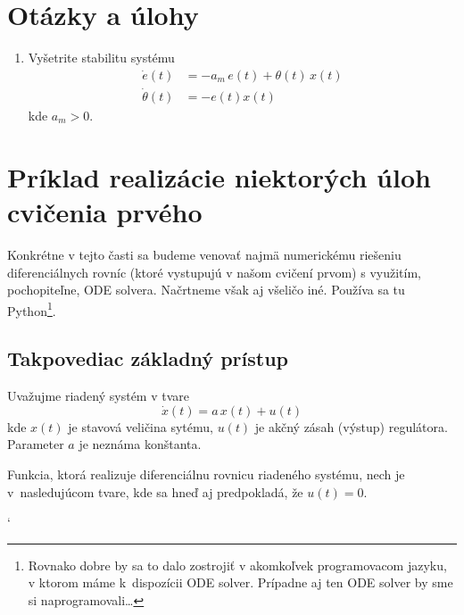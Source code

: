 \documentclass[a4paper, 10pt, ]{article}
\begin{document}
\section{Otázky a úlohy}

\begin{enumerate}[leftmargin=0pt, labelsep=3mm, itemsep=0pt]

	\item Vyšetrite stabilitu systému
	\begin{align*}
		\dot{e}(t) &= -a_m\,e(t) + \theta(t) \, x(t)  \\
		\dot{\theta}(t) &= -e(t) x(t)
	\end{align*}
	kde $a_m > 0$.

\end{enumerate}







\section{Príklad realizácie niektorých úloh cvičenia prvého}

Konkrétne v tejto časti sa budeme venovať najmä numerickému riešeniu diferenciálnych rovníc (ktoré vystupujú v našom cvičení prvom) s využitím, pochopiteľne, ODE solvera. Načrtneme však aj všeličo iné. Používa sa tu Python\footnote{Rovnako dobre by sa to dalo zostrojiť v akomkoľvek programovacom jazyku, v ktorom máme k~dispozícii ODE solver. Prípadne aj ten ODE solver by sme si naprogramovali\ldots}.





\subsection{Takpovediac základný prístup}



Uvažujme riadený systém v tvare
\begin{equation}
	\dot{x}(t) = a\, x(t) + u(t)
\end{equation}
kde $x(t)$ je stavová veličina sytému, $u(t)$ je akčný zásah (výstup) regulátora. Parameter $a$ je neznáma konštanta.

Funkcia, ktorá realizuje diferenciálnu rovnicu riadeného systému, nech je v~nasledujúcom tvare, kde sa hneď aj predpokladá, že $u(t)=0$.

{\catcode`

}
\end{document}
